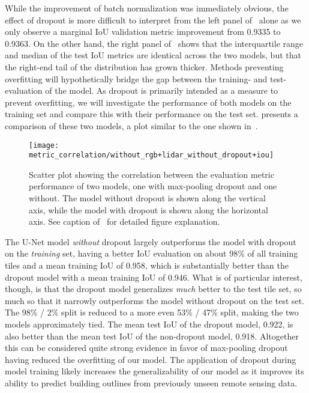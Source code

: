 While the improvement of batch normalization was immediately obvious, the effect of dropout is more difficult to interpret from the left panel of~ alone as we only observe a marginal IoU validation metric improvement from \num{0.9335} to \num{0.9363}.
On the other hand, the right panel of~ shows that the interquartile range and median of the test IoU metrics are identical across the two models, but that the right-end tail of the distribution has grown thicker.
Methods preventing overfitting will hypothetically bridge the gap between the training- and test-evaluation of the model.
As dropout is primarily intended as a measure to prevent overfitting, we will investigate the performance of both models on the training set and compare this with their performance on the test set.
 presents a comparison of these two models, a plot similar to the one shown in~.
\vspace{-\baselineskip}
\begin{figure}[H]
  \centering
  \texttt{[image: metric\_correlation/without\_rgb+lidar\_without\_dropout+iou]}
  \vspace{-\baselineskip}
  \caption{%
    Scatter plot showing the correlation between the evaluation metric performance of two models, one with max-pooling dropout and one without.
    The model without dropout is shown along the vertical axis, while the model with dropout is shown along the horizontal axis.
    See caption of~ for detailed figure explanation.
  }%
  \label{fig:dropout-train-test}
\end{figure}

The U-Net model \emph{without} dropout largely outperforms the model with dropout on the \emph{training} set, having a better IoU evaluation on about 98\% of all training tiles and a mean training IoU of \num{0.958}, which is substantially better than the dropout model with a mean training IoU of \num{0.946}.
What is of particular interest, though, is that the dropout model generalizes \emph{much} better to the test tile set, so much so that it narrowly outperforms the model without dropout on the test set.
The 98\% / 2\% split is reduced to a more even 53\% / 47\% split, making the two models approximately tied.
The mean test IoU of the dropout model, \num{0.922}, is also better than the mean test IoU of the non-dropout model, \num{0.918}.
Altogether this can be considered quite strong evidence in favor of max-pooling dropout having reduced the overfitting of our model.
The application of dropout during model training likely increases the generalizability of our model as it improves its ability to predict building outlines from previously unseen remote sensing data.

